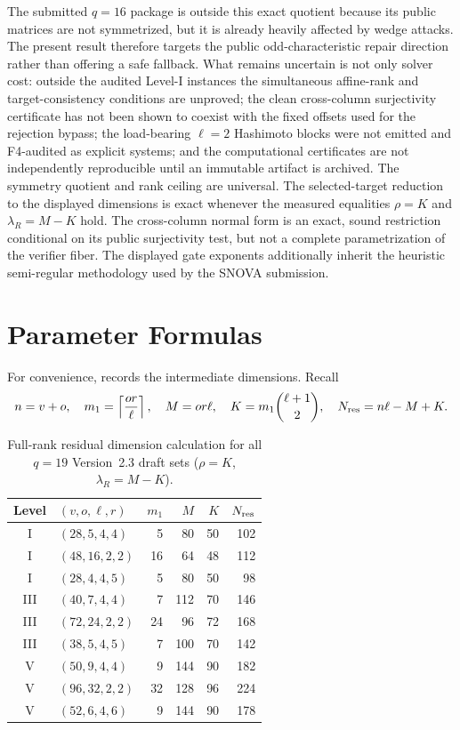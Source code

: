 \documentclass[11pt]{article}
\newcommand{\SNOVA}{\textsf{SNOVA}}
\begin{document}
The submitted $q=16$ package is outside this exact quotient because its public
matrices are not symmetrized, but it is already heavily affected by wedge attacks.
The present result therefore targets the public odd-characteristic repair
direction rather than offering a safe fallback.  What remains uncertain is
not only solver cost: outside the audited Level-I instances the simultaneous
affine-rank and target-consistency conditions are unproved; the clean
cross-column surjectivity certificate has not been shown to coexist with the
fixed offsets used for the rejection bypass; the load-bearing $\ell=2$
Hashimoto blocks were not emitted and F4-audited as explicit systems; and the
computational certificates are not independently reproducible until an
immutable artifact is archived.  The symmetry quotient and rank ceiling are
universal.  The selected-target reduction to the displayed dimensions is exact
whenever the measured equalities $\rho=K$ and $\lambda_R=M-K$ hold.  The
cross-column normal form is an exact, sound restriction conditional on its public
surjectivity test, but not a complete parametrization of the verifier fiber.  The
displayed gate exponents additionally inherit the heuristic semi-regular
methodology used by the \SNOVA{} submission.

\appendix
\setcounter{section}{0}
\renewcommand{\thesection}{\Alph{section}}
\renewcommand{\theHsection}{app.\Alph{section}}

\section{Parameter Formulas}\label{app:parameters}

For convenience,  records the intermediate dimensions.  Recall
\[
 n=v+o,
 \quad m_1=\left\lceil\frac{or}{\ell}\right\rceil,
 \quad M=or\ell,
 \quad K=m_1\binom{\ell+1}{2},
 \quad N_{\rm res}=n\ell-M+K.
\]

\begin{table}[ht]
\centering
\caption{Full-rank residual dimension calculation for all $q=19$ Version~2.3 draft sets ($\rho=K$, $\lambda_R=M-K$).}\label{tab:params}
\small
\begin{tabular}{@{}c l r r r r@{}}
\toprule
Level & $(v,o,\ell,r)$ & $m_1$ & $M$ & $K$ & $N_{\rm res}$\\
\midrule
I   & $(28,5,4,4)$  & 5  & 80  & 50 & 102\\
I   & $(48,16,2,2)$ & 16 & 64  & 48 & 112\\
I   & $(28,4,4,5)$  & 5  & 80  & 50 & 98\\
III & $(40,7,4,4)$  & 7  & 112 & 70 & 146\\
III & $(72,24,2,2)$ & 24 & 96  & 72 & 168\\
III & $(38,5,4,5)$  & 7  & 100 & 70 & 142\\
V   & $(50,9,4,4)$  & 9  & 144 & 90 & 182\\
V   & $(96,32,2,2)$ & 32 & 128 & 96 & 224\\
V   & $(52,6,4,6)$  & 9  & 144 & 90 & 178\\
\bottomrule
\end{tabular}
\end{table}
\end{document}
